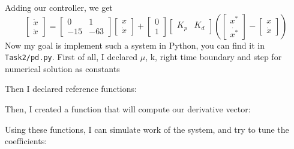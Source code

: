 \documentclass[a4paper,12pt]{article}
\begin{document}
        Adding our controller, we get 
        \begin{equation*}
            \begin{bmatrix}
                \dot{x}\\
                \ddot{x}
            \end{bmatrix}
            = 
            \begin{bmatrix}
                0 & 1 \\
                -15 & -63
            \end{bmatrix}
            \begin{bmatrix}
                x\\
                \dot{x}
            \end{bmatrix}
            +
            \begin{bmatrix}
                0 \\
                1
            \end{bmatrix}
            \begin{bmatrix}
                K_p & K_d
            \end{bmatrix}
            \left(
            \begin{bmatrix}
                x^*\\
                \dot{x^*}
            \end{bmatrix}
            -
            \begin{bmatrix}
                x\\
                \dot{x}
            \end{bmatrix}
            \right)
        \end{equation*}
        Now my goal is implement such a system in Python, you can find it in 
        \texttt{Task2/pd.py}. First of all, I declared $\mu$, k, right time 
        boundary and step for numerical solution as constants
        
        Then I declared reference functions:
        
        Then, I created a function that will compute our derivative vector:
        
        Using these functions, I can simulate work of the system, and try to tune the 
        coefficients:
        
\end{document}
